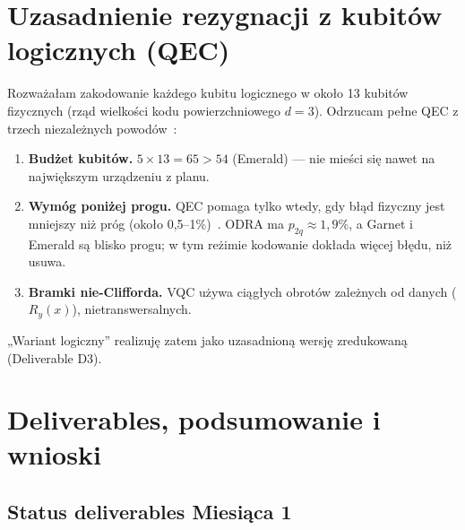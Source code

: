 \documentclass[11pt,a4paper]{article}
\begin{document}
\section{Uzasadnienie rezygnacji z kubitów logicznych (QEC)}
\label{sec:qec}

Rozważałam zakodowanie każdego kubitu logicznego w około 13 kubitów fizycznych (rząd
wielkości kodu powierzchniowego $d=3$). Odrzucam pełne QEC z trzech niezależnych
powodów~\cite{li2017,cai2023}:

\begin{enumerate}
\item \textbf{Budżet kubitów.} $5 \times 13 = 65 > 54$ (Emerald) --- nie mieści się nawet na
      największym urządzeniu z planu.
\item \textbf{Wymóg poniżej progu.} QEC pomaga tylko wtedy, gdy błąd fizyczny jest mniejszy
      niż próg (około 0,5--1\%)~\cite{googleqec2025}. ODRA ma $p_{2q}\approx 1{,}9\%$, a Garnet
      i Emerald są blisko progu; w tym reżimie kodowanie dokłada więcej błędu, niż usuwa.
\item \textbf{Bramki nie-Clifforda.} VQC używa ciągłych obrotów zależnych od danych
      ($R_y(x)$), nietranswersalnych.
\end{enumerate}

„Wariant logiczny” realizuję zatem jako uzasadnioną wersję zredukowaną (Deliverable D3).

\section{Deliverables, podsumowanie i wnioski}
\label{sec:deliverables}

\subsection{Status deliverables Miesiąca 1}
\end{document}
